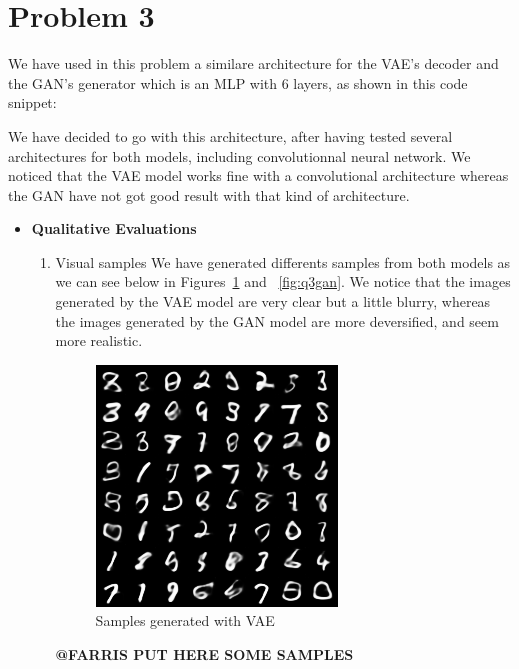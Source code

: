 \section*{Problem 3}
We have used in this problem a similare architecture for the VAE's decoder and the GAN's generator which is an MLP with 6 layers, as shown in this code snippet:


We have decided to go with this architecture, after having tested several architectures for both models, including convolutionnal neural network. We noticed that the VAE model works fine with a convolutional architecture whereas the GAN have not got good result with that kind of architecture.

\begin{itemize}
\item[A.] {\textbf{Qualitative Evaluations}}\\
\begin{enumerate}
	\item[1.]{Visual samples}
	We have generated differents samples from both models as we can see below in Figures~\ref{fig:q3vae} and ~\ref{fig:q3gan}. We notice that the images generated by the VAE model are very clear but a little blurry, whereas the images generated by the GAN model are more deversified, and seem more realistic. 
	\begin{figure}[H]
		\centering
		\includegraphics[scale=1]{Q3vaesample.png}
		\caption{Samples generated with VAE}
		\label{fig:q3vae}
	\end{figure}
	
	\textbf{@FARRIS PUT HERE SOME SAMPLES}
	

\end{enumerate}
\end{itemize}
